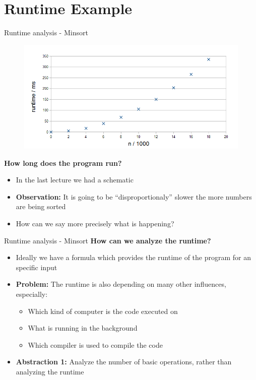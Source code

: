 \section{Runtime Example}



\begin{frame}{Runtime analysis - Minsort}
  \vspace{-1em}
  \begin{figure}[!h]
    \includegraphics[width=0.75\linewidth]{Images/MinSort/Minsort.png}
    \label{fig:introduction:minsort_runtime}
  \end{figure}
  \vspace{-0.5em}
  \textbf{How long does the program run?}
  \begin{itemize}
    \item<2- |handout:1>
      In the last lecture we had a schematic
    \item<2- |handout:1>
      \textbf{Observation:} It is going to be \enquote{disproportionaly} slower
      the more numbers are being sorted
    \item<3- |handout:1>
      How can we say more precisely what is happening?
  \end{itemize}
\end{frame}


\begin{frame}{Runtime analysis - Minsort}
  \textbf{How can we analyze the runtime?}
  \begin{itemize}
    \item<1- |handout:1>
      Ideally we have a formula which provides the runtime of the program for
      an specific input
    \item<2- |handout:1>
      \textbf{Problem:}
      The runtime is also depending on many other influences, especially:
      \begin{itemize}
        \item
          Which kind of computer is the code executed on
        \item What is running in the background
        \item Which compiler is used to compile the code
      \end{itemize}
    \item<3- |handout:1>
      \textbf{Abstraction 1:}
      Analyze the number of basic operations, rather than analyzing the runtime
  \end{itemize}
\end{frame}